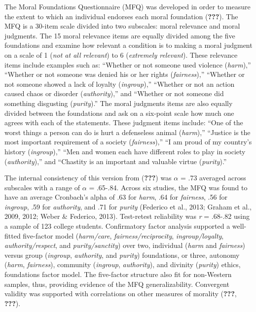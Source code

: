 \documentclass[english,man]{apa6}
\theoremstyle{definition}
\theoremstyle{definition}
\theoremstyle{definition}
\theoremstyle{remark}
\begin{document}
The Moral Foundations Questionnaire (MFQ) was developed in order to
measure the extent to which an individual endorses each moral foundation
({\textbf{???}}). The MFQ is a 30-item scale divided into two subscales:
moral relevance and moral judgments. The 15 moral relevance items are
equally divided among the five foundations and examine how relevant a
condition is to making a moral judgment on a scale of 1 (\emph{not at
all relevant}) to 6 (\emph{extremely relevant}). These relevance items
include examples such as: \enquote{Whether or not someone used violence
(\emph{harm}),} \enquote{Whether or not someone was denied his or her
rights (\emph{fairness}),} \enquote{Whether or not someone showed a lack
of loyalty (\emph{ingroup}),} \enquote{Whether or not an action caused
chaos or disorder (\emph{authority}),} and \enquote{Whether or not
someone did something disgusting (\emph{purity}).} The moral judgments
items are also equally divided between the foundations and ask on a
six-point scale how much one agrees with each of the statements. These
judgment items include: \enquote{One of the worst things a person can do
is hurt a defenseless animal (\emph{harm}),} \enquote{Justice is the
most important requirement of a society (\emph{fairness}),} \enquote{I
am proud of my country's history (\emph{ingroup}),} \enquote{Men and
women each have different roles to play in society (\emph{authority}),}
and \enquote{Chastity is an important and valuable virtue
(\emph{purity}).}

The internal consistency of this version from ({\textbf{???}}) was
\(\alpha\) = .73 averaged across subscales with a range of \(\alpha\) =
.65-.84. Across six studies, the MFQ was found to have an average
Cronbach's alpha of .63 for \emph{harm}, .64 for \emph{fairness}, .56
for \emph{ingroup}, .59 for \emph{authority}, and .71 for \emph{purity}
(Federico et al., 2013; Graham et al., 2009, 2012; Weber \& Federico,
2013). Test-retest reliability was \emph{r} = .68-.82 using a sample of
123 college students. Confirmatory factor analysis supported a
well-fitted five-factor model (\emph{harm/care},
\emph{fairness/reciprocity}, \emph{ingroup/loyalty},
\emph{authority/respect}, and \emph{purity/sanctity}) over two,
individual (\emph{harm} and \emph{fairness}) versus group
(\emph{ingroup}, \emph{authority}, and \emph{purity}) foundations, or
three, autonomy (\emph{harm}, \emph{fairness}), community
(\emph{ingroup}, \emph{authority}), and divinity (\emph{purity}) ethics,
foundations factor model. The five-factor structure also fit for
non-Western samples, thus, providing evidence of the MFQ
generalizability. Convergent validity was supported with correlations on
other measures of morality ({\textbf{???}}, {\textbf{???}}).
\end{document}
